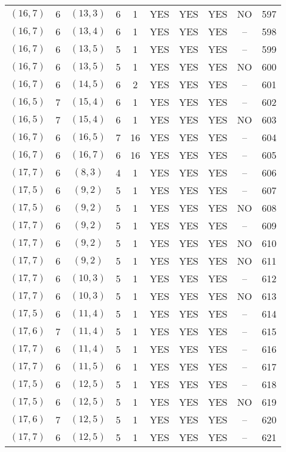 \begin{longtable}{|c|c|c|c|c|c|c|c|c|c|}
$(16, 7)$ & 6 & $(13, 3)$ & 6 & 1 & YES & YES & YES & NO & 597\\
$(16, 7)$ & 6 & $(13, 4)$ & 6 & 1 & YES & YES & YES & -- & 598\\
$(16, 7)$ & 6 & $(13, 5)$ & 5 & 1 & YES & YES & YES & -- & 599\\
$(16, 7)$ & 6 & $(13, 5)$ & 5 & 1 & YES & YES & YES & NO & 600\\
$(16, 7)$ & 6 & $(14, 5)$ & 6 & 2 & YES & YES & YES & -- & 601\\
$(16, 5)$ & 7 & $(15, 4)$ & 6 & 1 & YES & YES & YES & -- & 602\\
$(16, 5)$ & 7 & $(15, 4)$ & 6 & 1 & YES & YES & YES & NO & 603\\
$(16, 7)$ & 6 & $(16, 5)$ & 7 & 16 & YES & YES & YES & -- & 604\\
$(16, 7)$ & 6 & $(16, 7)$ & 6 & 16 & YES & YES & YES & -- & 605\\
$(17, 7)$ & 6 & $(8, 3)$ & 4 & 1 & YES & YES & YES & -- & 606\\
$(17, 5)$ & 6 & $(9, 2)$ & 5 & 1 & YES & YES & YES & -- & 607\\
$(17, 5)$ & 6 & $(9, 2)$ & 5 & 1 & YES & YES & YES & NO & 608\\
$(17, 7)$ & 6 & $(9, 2)$ & 5 & 1 & YES & YES & YES & -- & 609\\
$(17, 7)$ & 6 & $(9, 2)$ & 5 & 1 & YES & YES & YES & NO & 610\\
$(17, 7)$ & 6 & $(9, 2)$ & 5 & 1 & YES & YES & YES & NO & 611\\
$(17, 7)$ & 6 & $(10, 3)$ & 5 & 1 & YES & YES & YES & -- & 612\\
$(17, 7)$ & 6 & $(10, 3)$ & 5 & 1 & YES & YES & YES & NO & 613\\
$(17, 5)$ & 6 & $(11, 4)$ & 5 & 1 & YES & YES & YES & -- & 614\\
$(17, 6)$ & 7 & $(11, 4)$ & 5 & 1 & YES & YES & YES & -- & 615\\
$(17, 7)$ & 6 & $(11, 4)$ & 5 & 1 & YES & YES & YES & -- & 616\\
$(17, 7)$ & 6 & $(11, 5)$ & 6 & 1 & YES & YES & YES & -- & 617\\
$(17, 5)$ & 6 & $(12, 5)$ & 5 & 1 & YES & YES & YES & -- & 618\\
$(17, 5)$ & 6 & $(12, 5)$ & 5 & 1 & YES & YES & YES & NO & 619\\
$(17, 6)$ & 7 & $(12, 5)$ & 5 & 1 & YES & YES & YES & -- & 620\\
$(17, 7)$ & 6 & $(12, 5)$ & 5 & 1 & YES & YES & YES & -- & 621\\

\end{longtable}
